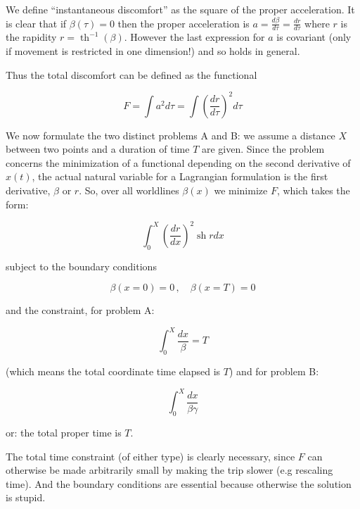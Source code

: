 \documentclass{article}
\newcommand{\tder}[2]{\frac{d#1}{d#2}}
\renewcommand{\sinh}{\operatorname{sh}}
\renewcommand{\tanh}{\operatorname{th}}
\begin{document}
We define ``instantaneous discomfort'' as the square of the proper acceleration. It is clear that if $\beta(\tau) = 0$ then the proper acceleration is $a = \tder{\beta}{\tau} = \tder{r}{\tau}$ where $r$ is the rapidity $r = \tanh^{-1}(\beta)$. However the last expression for $a$ is covariant (only if movement is restricted in one dimension!) and so holds in general.

Thus the total discomfort can be defined as the functional

\begin{equation}
	F = \int a^2 d\tau = \int \left( \tder{r}{\tau} \right)^2 d\tau
	\label{}
\end{equation}

We now formulate the two distinct problems A and B: we assume a distance $X$ between two points and a duration of time $T$ are given. Since the problem concerns the minimization of a functional depending on the second derivative of $x(t)$, the actual natural variable for a Lagrangian formulation is the first derivative, $\beta$ or $r$. So, over all worldlines $\beta(x)$ we minimize $F$, which takes the form:

\begin{equation}
	\int_0^X \left( \tder{r}{x} \right)^2 \sinh r dx
	\label{}
\end{equation}

subject to the boundary conditions

\begin{equation}
	\beta(x = 0) = 0\,,\quad \beta(x = T) = 0
	\label{}
\end{equation}

and the constraint, for problem A:

\begin{equation}
	\int_0^X \frac{dx}\beta = T
	\label{}
\end{equation}

(which means the total coordinate time elapsed is $T$) and for problem B:

\begin{equation}
	\int_0^X \frac{dx}{\beta\gamma} 
	\label{}
\end{equation}

or: the total proper time is $T$.

The total time constraint (of either type) is clearly necessary, since $F$ can otherwise be made arbitrarily small by making the trip slower (e.g rescaling time). And the boundary conditions are essential because otherwise the solution is stupid.
\end{document}
